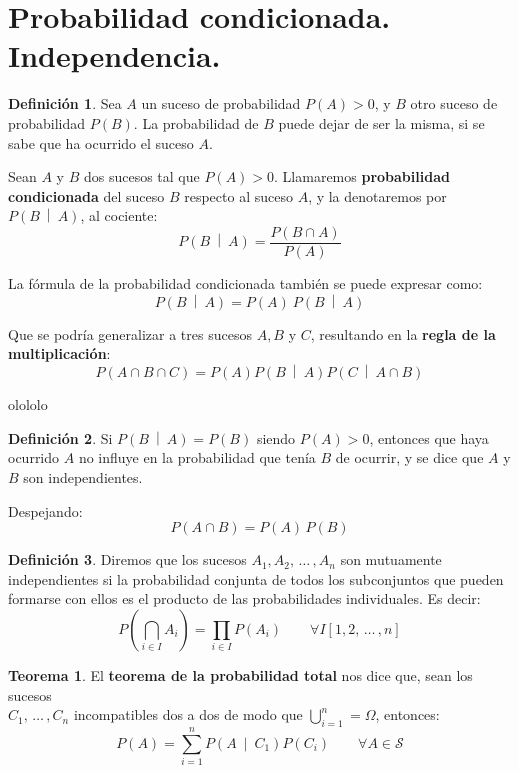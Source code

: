 \documentclass[a4paper]{book}
\numberwithin{figure}{section}
\numberwithin{equation}{subsection}
\numberwithin{figure}{chapter}
\theoremstyle{definition}
\newtheorem{teorema}{Teorema}
\newtheorem{definicion}{Definición}
\newcommand{\psus}{\, \ldots \,}
\newcommand{\probCond}[2]{P \left( #1 \: \middle\vert\:  #2 \right) }
\begin{document}
\section{Probabilidad condicionada. Independencia.}
\begin{definicion}
	Sea $A$ un suceso de probabilidad $P(A)>0$, y $B$ otro suceso de probabilidad $P(B)$. La probabilidad de $B$ puede dejar de ser la misma, si se sabe que ha ocurrido el suceso $A$.

	Sean $A$ y $B$ dos sucesos tal que $P(A)>0$. Llamaremos \textbf{probabilidad condicionada} del suceso $B$ respecto al suceso $A$, y la denotaremos por $\probCond{B}{A}$, al cociente: \[ \probCond{B}{A}  = \frac{P\left(  B\cap A\right)}{P(A)}\]

	La fórmula de la probabilidad condicionada también se puede expresar como: \[\probCond{B}{A} = P(A)\ \probCond{B}{A} \]

	Que se podría generalizar a tres sucesos $A, B$ y $C$, resultando en la \textbf{regla de la multiplicación}: \[P(A\cap B \cap C)=P(A)\probCond{B}{A}\probCond{C}{A\cap B}\]

	olololo
\end{definicion}

\begin{definicion}
	Si $\probCond{B}{A} =P(B)$ siendo $P(A)>0$, entonces que haya ocurrido $A$ no influye en la probabilidad que tenía $B$ de ocurrir, y se dice que $A$ y $B$ son independientes.

	Despejando: \[P(A\cap B) = P(A)\, P(B)\]
\end{definicion}

\begin{definicion}
	Diremos que los sucesos $A_1,A_2,\, \ldots\, ,A_n$ son mutuamente independientes si la probabilidad conjunta de todos los subconjuntos que pueden formarse con ellos es el producto de las probabilidades individuales. Es decir: \[P\left( \bigcap_{i\in I} A_i \right) = \prod_{i\in I}{P(A_i)} \qquad \forall I \left[ 1, 2, \, \ldots	\, ,n \right] \]
\end{definicion}

\begin{teorema}
	El \textbf{teorema de la probabilidad total} nos dice que, sean los sucesos\\ $C_1, \psus ,C_n$ incompatibles dos a dos de modo que $\bigcup^{n}_{i=1}=\Omega$, entonces:
	\[\boxed{P(A)=\sum^{n}_{i=1}{\probCond{A}{C_1}}P(C_i)}\qquad  \forall A \in \mathcal{S}\]
\end{teorema}
\end{document}
